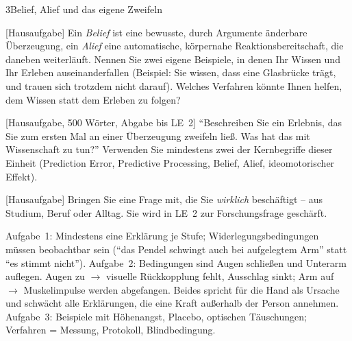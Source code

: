 \begin{uebungsblattb}{3}{Belief, Alief und das eigene Zweifeln}

[Hausaufgabe]
Ein \emph{Belief} ist eine bewusste, durch Argumente änderbare Überzeugung,
ein \emph{Alief} eine automatische, körpernahe Reaktionsbereitschaft, die
daneben weiterläuft. Nennen Sie zwei eigene Beispiele, in denen Ihr Wissen
und Ihr Erleben auseinanderfallen (Beispiel: Sie wissen, dass eine Glasbrücke trägt, und
trauen sich trotzdem nicht darauf). Welches Verfahren könnte Ihnen helfen,
dem Wissen statt dem Erleben zu folgen?

[Hausaufgabe, 500 Wörter, Abgabe bis LE~2]
\enquote{Beschreiben Sie ein Erlebnis, das Sie zum ersten Mal an einer
Überzeugung zweifeln ließ. Was hat das mit Wissenschaft zu tun?} Verwenden
Sie mindestens zwei der Kernbegriffe dieser Einheit (Prediction Error,
Predictive Processing, Belief, Alief, ideomotorischer Effekt).

[Hausaufgabe]
Bringen Sie eine Frage mit, die Sie \emph{wirklich} beschäftigt -- aus
Studium, Beruf oder Alltag. Sie wird in LE~2 zur Forschungsfrage geschärft.

\begin{lehrhinweis}[Erwartungshorizont]
Aufgabe~1: Mindestens eine Erklärung je Stufe; Widerlegungsbedingungen
müssen beobachtbar sein (\enquote{das Pendel schwingt auch bei
aufgelegtem Arm} statt \enquote{es stimmt nicht}). Aufgabe~2: Bedingungen
sind Augen schließen und Unterarm auflegen. Augen zu $\to$ visuelle
Rückkopplung fehlt, Ausschlag sinkt; Arm auf $\to$ Muskelimpulse werden
abgefangen. Beides spricht für die Hand als Ursache und schwächt alle
Erklärungen, die eine Kraft außerhalb der Person annehmen.
Aufgabe~3: Beispiele mit Höhenangst, Placebo, optischen Täuschungen;
Verfahren = Messung, Protokoll, Blindbedingung.
\end{lehrhinweis}
\end{uebungsblattb}
